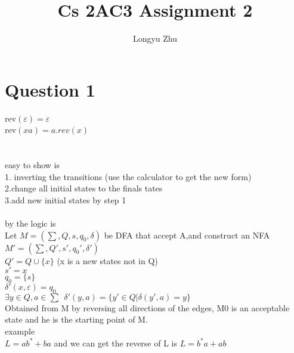 \documentclass[12pt]{article}
\title{Cs 2AC3 Assignment 2}
\author{Longyu Zhu}
\begin{document}
    \section*{Question 1}
    rev$\left(\varepsilon\right)=\varepsilon$\\
    rev$\left(xa\right)=a.rev\left(x\right)$\\
    \\\\
    easy to show is\\ 1. inverting the transitions (use the calculator to get the new form) \\
    2.change all initial states to the finals tates\\
    3.add new initial states by step 1\\
    \\

    by the logic is \\
    Let $M=\left(\sum ,Q,s,q_0,\delta \right)$ be DFA that accept A,and construct an NFA 
    $M'=\left(\sum,Q',s',q_0',\delta'\right)$\\
    $Q'=Q \cup \{x\}$ (x is a new states not in Q)\\
    $s'=x$\\
    $q_0=\{s\}$\\
    $\delta'\left(x,\varepsilon\right)=q_0$\\
    $\exists y\in Q,a\in\sum~~\delta'\left(y,a\right)=\{y'\in Q|\delta\left(y',a\right)=y\}$\\
    Obtained from M by reversing all directions of the edges, M0 is an acceptable state and he is the starting point of M.\\
    example\\
    $L=ab^*+ba$ and we can get the reverse of L is $L=b^*a+ab$\\
\end{document}
